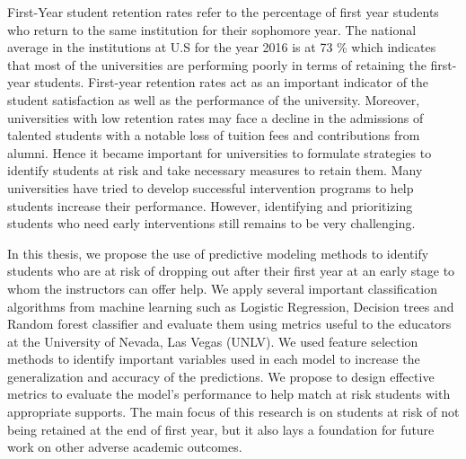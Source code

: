 \documentclass[11pt,openright]{report}
\begin{document}
\thesistitlepage
\copyrightpage

\newpage

\electronicapprovalpage


\begin{thesisabstract}
First-Year student retention rates refer to the percentage of first year students who return to the same institution for their sophomore year. The national average in the institutions at U.S for the year 2016 is at 73 \% which indicates that most of the universities are performing poorly in terms of retaining the first-year students. First-year retention rates act as an important indicator of the student satisfaction as well as the performance of the university. Moreover, universities with low retention rates may face a decline in the admissions of talented students with a notable loss of tuition fees and contributions from alumni. Hence it became important for universities to formulate strategies to identify students at risk and take necessary measures to retain them. Many universities have tried to develop successful intervention programs to help students increase their performance. However, identifying and prioritizing students who need early interventions still remains to be very challenging.  

In this thesis, we propose the use of predictive modeling methods to identify students who are at risk of dropping out after their first year at an early stage to whom the instructors can offer help. We apply several important classification algorithms from machine learning such as Logistic Regression, Decision trees and Random forest classifier and evaluate them using metrics useful to the educators at the University of Nevada, Las Vegas (UNLV). We used feature selection methods to identify important variables used in each model to increase the generalization and accuracy of the predictions. We propose to design effective metrics to evaluate the model's performance to help match at risk students with appropriate supports. The main focus of this research is on students at risk of not being retained at the end of first year, but it also lays a foundation for future work on other adverse academic outcomes. 
\end{thesisabstract}
\end{document}
